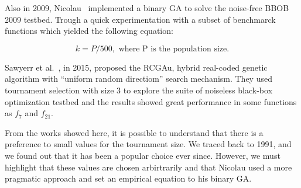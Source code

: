 Also in 2009, Nicolau~\cite{nicolau2009application} implemented a binary GA to solve the noise-free BBOB 2009 testbed. Trough a quick experimentation with a subset of benchmarck functions which yielded the following equation:

\begin{equation}
	k = P/500, \text{ where P is the population size.}
\end{equation}


Sawyerr et al.~\cite{sawyerr2015benchmarking}, in 2015, proposed the RCGAu, hybrid real-coded genetic algorithm with ``uniform random directiom'' search mechanism. They used tournament selection with size 3 to explore the suite of noiseless black-box optimization testbed and the results showed great performance in some functions as $f_7$ and $f_{21}$.

From the works showed here, it is possible to understand that there is a preference to small values for the tournament size. We traced back to 1991, and we found out that it has been a popular choice ever since. However, we must highlight that these values are chosen arbirtrarily and that Nicolau used a more pragmatic approach and set an empirical equation to his binary GA. 




